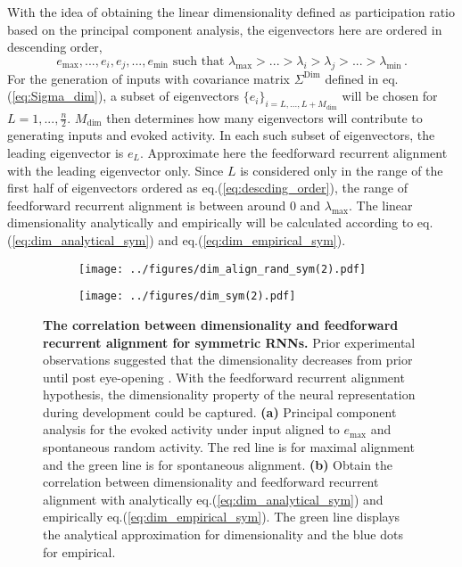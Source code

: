 \documentclass[11pt]{article}
\begin{document}
	With the idea of obtaining the linear dimensionality defined as participation ratio 
	based on the principal component analysis, the eigenvectors here are ordered in descending order, 
		\begin{equation} \label{eq:descding_order}
			e_{\text{max}}, ..., e_i, e_j, ..., e_{\text{min}} \, \, \text{such that} \, \, \lambda_{\text{max}} > ...> \lambda_i > \lambda_j > ... > \lambda_{\text{min}} \, .
		\end{equation}
	For the generation of inputs with covariance matrix $\Sigma^{\text{Dim}}$ defined in eq.(\ref{eq:Sigma_dim}), a subset of eigenvectors $\{e_i\}_{i = L, ..., L+M_{\text{dim}}}$ will be chosen for $L=1, ..., \frac{n}{2}$. $M_{\text{dim}}$ then determines how many eigenvectors will contribute to generating inputs and evoked activity. In each such subset of eigenvectors, the leading eigenvector is $e_L$. Approximate here the feedforward recurrent alignment with the leading eigenvector only. Since $L$ is considered only in the range of the first half of eigenvectors ordered as eq.(\ref{eq:descding_order}), the range of feedforward recurrent alignment is between around $0$ and $\lambda_{\text{max}}$. The linear dimensionality analytically and empirically will be calculated according to eq.(\ref{eq:dim_analytical_sym}) and eq.(\ref{eq:dim_empirical_sym}). 

		\begin{figure}[H] 
			\centering
			\begin{subfigure}[b]{0.45\textwidth} 
				\texttt{[image: ../figures/dim\_align\_rand\_sym(2).pdf]}
				\caption{}
			\end{subfigure}
			\hfill
			\begin{subfigure}[b]{0.44\textwidth}
				\texttt{[image: ../figures/dim\_sym(2).pdf]}
				\caption{}
				\label{fig:dim_sym}
			\end{subfigure}
			\vspace{-0.2cm}
			\caption[The correlation between dimensionality and feedforward recurrent alignment for symmetric RNNs]{\textbf{The correlation between dimensionality and feedforward recurrent alignment for symmetric RNNs.} Prior experimental observations suggested that the dimensionality decreases from prior until post eye-opening \cite{tragenap2023nature}. With the feedforward recurrent alignment hypothesis, the dimensionality property of the neural representation during development could be captured. \textbf{(a)} Principal component analysis for the evoked activity under input aligned to $e_{\text{max}}$ and spontaneous random activity. The red line is for maximal alignment and the green line is for spontaneous alignment. \textbf{(b)} Obtain the correlation between dimensionality and feedforward recurrent alignment with analytically eq.(\ref{eq:dim_analytical_sym}) and empirically eq.(\ref{eq:dim_empirical_sym}). The green line displays the analytical approximation for dimensionality and the blue dots for empirical.} 
			\label{fig:correlation_dim_ffrec_sym}
		\end{figure}
\end{document}
